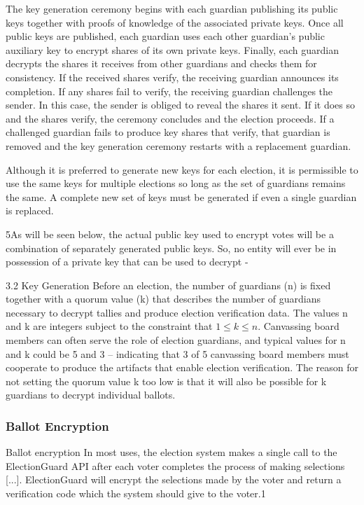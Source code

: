 The key generation ceremony begins with each guardian publishing its public keys together with proofs of knowledge
of the associated private keys. Once all public keys are published, each guardian uses each other guardian’s public
auxiliary key to encrypt shares of its own private keys. Finally, each guardian decrypts the shares it receives from
other guardians and checks them for consistency. If the received shares verify, the receiving guardian announces its
completion. If any shares fail to verify, the receiving guardian challenges the sender. In this case, the sender is
obliged to reveal the shares it sent. If it does so and the shares verify, the ceremony concludes and the election
proceeds. If a challenged guardian fails to produce key shares that verify, that guardian is removed and the key
generation ceremony restarts with a replacement guardian. \cite[2]{eg-spec}

Although it is preferred to generate new keys for each election, it is permissible to use the same
keys for multiple elections so long as the set of guardians remains the same. A complete new set of keys must
be generated if even a single guardian is replaced.\cite[3]{eg-spec}

5As will be seen below, the actual public key used to encrypt votes will be a combination of separately generated public
keys. So, no entity will ever be in possession of a private key that can be used to decrypt
-\cite[5]{eg-spec}

3.2 Key Generation Before an election, the number of guardians (n) is fixed together with a quorum value (k) that
describes the number of guardians necessary to decrypt tallies and produce election verification data. The values n and
k are integers subject to the constraint that $1 \leq k \leq n$. Canvassing board members can often serve the role of election
guardians, and typical values for n and k could be 5 and 3 – indicating that 3 of 5 canvassing board members must
cooperate to produce the artifacts that enable election verification. The reason for not setting the quorum value k too
low is that it will also be possible for k guardians to decrypt individual ballots.
\cite[8]{eg-spec}

\subsubsection{Ballot Encryption}
Ballot encryption In most uses, the election system makes a single call to the ElectionGuard API after each voter
completes the process of making selections [...]. ElectionGuard will encrypt
the selections made by the voter and return a verification code which the system should give to the voter.1
\cite[3]{eg-spec}

